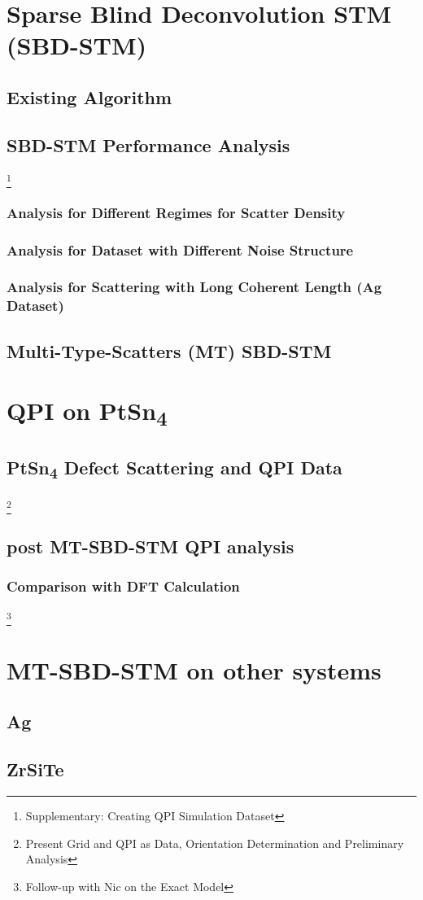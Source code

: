 \chapter{Sparse Blind Deconvolution STM (SBD-STM)}
\section{Existing Algorithm}
\section{SBD-STM Performance Analysis}
\footnote{Supplementary: Creating QPI Simulation Dataset}
\subsection{Analysis for Different Regimes for Scatter Density}
\subsection{Analysis for Dataset with Different Noise Structure}
\subsection{Analysis for Scattering with Long Coherent Length (Ag Dataset)}
\section{Multi-Type-Scatters (MT) SBD-STM}

\chapter{QPI on PtSn\textsubscript{4}}
\section{PtSn\textsubscript{4} Defect Scattering and QPI Data}
\footnote{Present Grid and QPI as Data, Orientation Determination and Preliminary Analysis}
\section{post MT-SBD-STM QPI analysis}
\subsection{Comparison with DFT Calculation}
\footnote{Follow-up with Nic on the Exact Model}

\chapter{MT-SBD-STM on other systems}
\section{Ag}
\section{ZrSiTe}
